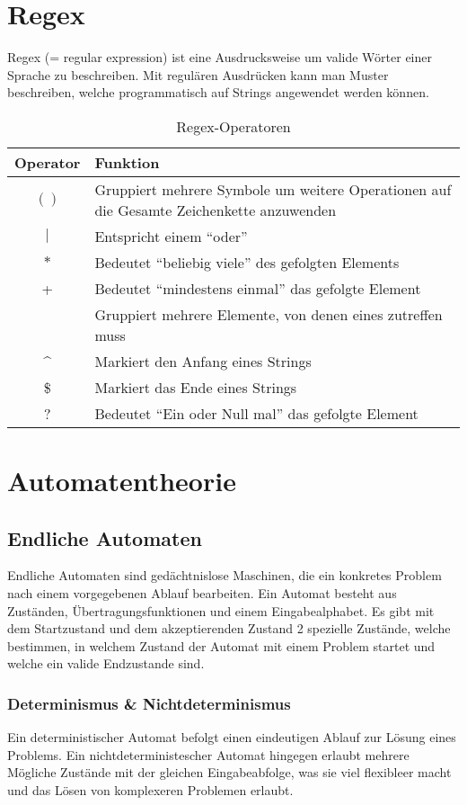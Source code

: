 \documentclass{article}
\begin{document}
\newpage
\section{Regex}
Regex (= regular expression) ist eine Ausdrucksweise um valide Wörter einer Sprache zu beschreiben. Mit regulären Ausdrücken kann man Muster beschreiben, welche programmatisch auf Strings angewendet werden können. 

\begin{table}[h!]
		\begin{center}
				\caption{Regex-Operatoren}
				\label{tab:Regexoperationen}
				\begin{tabular}{|c|p{8cm}|}
						\hline
						\textbf{Operator} & \textbf{Funktion} \\
						\hline
						$()$ & Gruppiert mehrere Symbole um weitere Operationen auf die Gesamte Zeichenkette anzuwenden\\
						\hline
						$|$ & Entspricht einem ``oder''\\
						\hline
						$*$ & Bedeutet ``beliebig viele'' des gefolgten Elements\\
						\hline
						+ & Bedeutet ``mindestens einmal'' das gefolgte Element\\
						\hline
						[ ] & Gruppiert mehrere Elemente, von denen eines zutreffen muss\\
						\hline
						\textasciicircum & Markiert den Anfang eines Strings\\
						\hline
						\$ & Markiert das Ende eines Strings\\
						\hline
						? & Bedeutet ``Ein oder Null mal'' das gefolgte Element\\
						\hline
				\end{tabular}
		\end{center}
\end{table}

\section{Automatentheorie}
\subsection{Endliche Automaten}
Endliche Automaten sind gedächtnislose Maschinen, die ein konkretes Problem nach einem vorgegebenen Ablauf bearbeiten. Ein Automat besteht aus Zuständen, Übertragungsfunktionen und einem Eingabealphabet. Es gibt mit dem Startzustand und dem akzeptierenden Zustand 2 spezielle Zustände, welche bestimmen, in welchem Zustand der Automat mit einem Problem startet und welche ein valide Endzustande sind.
\subsubsection{Determinismus \& Nichtdeterminismus}
Ein deterministischer Automat befolgt einen eindeutigen Ablauf zur Lösung eines Problems. Ein nichtdeterministescher Automat hingegen erlaubt mehrere Mögliche Zustände mit der gleichen Eingabeabfolge, was sie viel flexibleer macht und das Lösen von komplexeren Problemen erlaubt.
\end{document}
